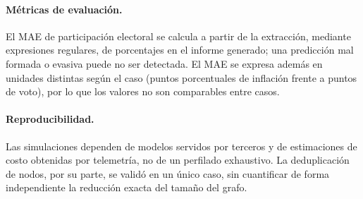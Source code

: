 \documentclass[11pt]{article}
\begin{document}
\paragraph{Métricas de evaluación.} El MAE de participación electoral se calcula a partir de la extracción, mediante expresiones regulares, de porcentajes en el informe generado; una predicción mal formada o evasiva puede no ser detectada. El MAE se expresa además en unidades distintas según el caso (puntos porcentuales de inflación frente a puntos de voto), por lo que los valores no son comparables entre casos.

\paragraph{Reproducibilidad.} Las simulaciones dependen de modelos servidos por terceros y de estimaciones de costo obtenidas por telemetría, no de un perfilado exhaustivo. La deduplicación de nodos, por su parte, se validó en un único caso, sin cuantificar de forma independiente la reducción exacta del tamaño del grafo.


\end{document}
